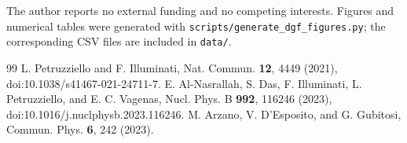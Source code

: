 \documentclass[aps,prl,twocolumn,superscriptaddress,nofootinbib,floatfix]{revtex4-2}
\begin{document}
\begin{acknowledgments}
The author reports no external funding and no competing interests. Figures and numerical tables were generated with \texttt{scripts/generate\_dgf\_figures.py}; the corresponding CSV files are included in \texttt{data/}.
\end{acknowledgments}

\begin{thebibliography}{99}
 L. Petruzziello and F. Illuminati, Nat. Commun. \textbf{12}, 4449 (2021), doi:10.1038/s41467-021-24711-7.
 E. Al-Nasrallah, S. Das, F. Illuminati, L. Petruzziello, and E. C. Vagenas, Nucl. Phys. B \textbf{992}, 116246 (2023), doi:10.1016/j.nuclphysb.2023.116246.
 M. Arzano, V. D'Esposito, and G. Gubitosi, Commun. Phys. \textbf{6}, 242 (2023).
\end{thebibliography}
\end{document}
